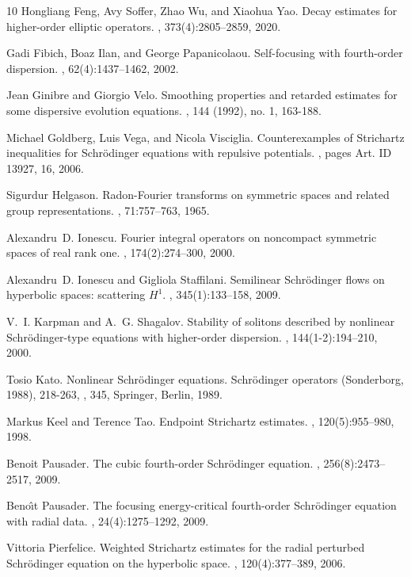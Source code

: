 \documentclass[10pt,leqno]{amsart}
\numberwithin{equation}{section}
\begin{document}
\begin{thebibliography}{10}
Hongliang Feng, Avy Soffer, Zhao Wu, and Xiaohua Yao.
\newblock Decay estimates for higher-order elliptic operators.
, 373(4):2805--2859, 2020.

Gadi Fibich, Boaz Ilan, and George Papanicolaou.
\newblock Self-focusing with fourth-order dispersion.
, 62(4):1437--1462, 2002.


Jean Ginibre and Giorgio Velo.
\newblock    Smoothing properties and retarded estimates for some dispersive evolution equations.
, 144 (1992), no. 1, 163-188. 

	

Michael Goldberg, Luis Vega, and Nicola Visciglia.
\newblock Counterexamples of {S}trichartz inequalities for {S}chr\"{o}dinger
  equations with repulsive potentials.
, pages Art. ID 13927, 16, 2006.

Sigurdur Helgason.
\newblock Radon-{F}ourier transforms on symmetric spaces and related group
  representations.
, 71:757--763, 1965.

Alexandru~D. Ionescu.
\newblock Fourier integral operators on noncompact symmetric spaces of real
  rank one.
, 174(2):274--300, 2000.

Alexandru~D. Ionescu and Gigliola Staffilani.
\newblock Semilinear {S}chr\"{o}dinger flows on hyperbolic spaces: scattering
  {$H^1$}.
, 345(1):133--158, 2009.

V.~I. Karpman and A.~G. Shagalov.
\newblock Stability of solitons described by nonlinear {S}chr\"{o}dinger-type
  equations with higher-order dispersion.
, 144(1-2):194--210, 2000.

Tosio Kato.
\newblock Nonlinear {S}chr\" odinger equations. {S}chr\" odinger operators (Sonderborg, 1988), 218-263,
, 345, Springer, Berlin, 1989. 


Markus Keel and Terence Tao.
\newblock Endpoint {S}trichartz estimates.
, 120(5):955--980, 1998.

Benoit Pausader.
\newblock The cubic fourth-order {S}chr\"{o}dinger equation.
, 256(8):2473--2517, 2009.

Beno\^{\i}t Pausader.
\newblock The focusing energy-critical fourth-order {S}chr\"{o}dinger equation
  with radial data.
, 24(4):1275--1292, 2009.

Vittoria Pierfelice.
\newblock Weighted {S}trichartz estimates for the radial perturbed
  {S}chr\"{o}dinger equation on the hyperbolic space.
, 120(4):377--389, 2006.

\end{thebibliography}
\end{document}
